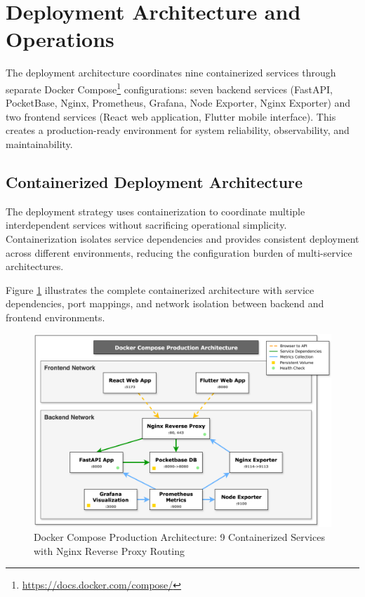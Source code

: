 
\section{Deployment Architecture and Operations} \label{section:deployment_operations}

The deployment architecture coordinates nine containerized services through separate Docker Compose\footnote{\url{https://docs.docker.com/compose/}} configurations: seven backend services (FastAPI, PocketBase, Nginx, Prometheus, Grafana, Node Exporter, Nginx Exporter) and two frontend services (React web application, Flutter mobile interface). This creates a production-ready environment for system reliability, observability, and maintainability.

\subsection{Containerized Deployment Architecture} \label{subsection:container_deployment}

The deployment strategy uses containerization to coordinate multiple interdependent services without sacrificing operational simplicity. Containerization isolates service dependencies and provides consistent deployment across different environments, reducing the configuration burden of multi-service architectures.

Figure \ref{fig:docker_architecture} illustrates the complete containerized architecture with service dependencies, port mappings, and network isolation between backend and frontend environments.

\begin{figure}[htbp]
    \centering
    \includegraphics[width=\textwidth]{figs/chapter4/docker_architecture_diagram.png}
    \caption[Docker Compose Production Architecture]{Docker Compose Production Architecture: 9 Containerized Services with Nginx Reverse Proxy Routing}
    \label{fig:docker_architecture}
\end{figure}

